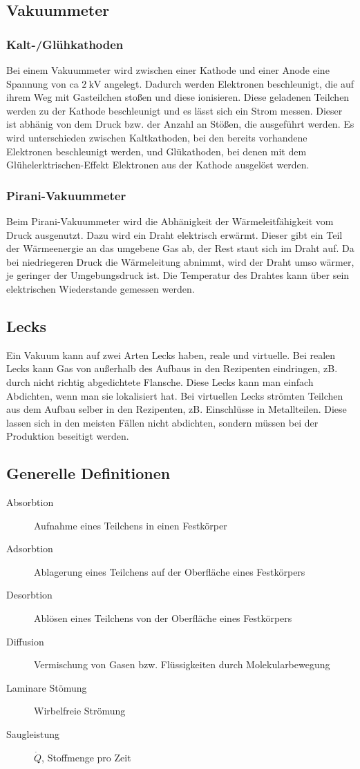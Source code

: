 \subsection{Vakuummeter}
\subsubsection{Kalt-/Glühkathoden}
Bei einem Vakuummeter wird zwischen einer Kathode und einer Anode eine Spannung von ca $\SI{2}{\kilo \volt}$ angelegt. Dadurch werden Elektronen
beschleunigt, die auf ihrem Weg mit Gasteilchen stoßen und diese ionisieren. Diese geladenen Teilchen werden zu der Kathode beschleunigt und es lässt sich ein
Strom messen. Dieser ist abhänig von dem Druck bzw. der Anzahl an Stößen, die ausgeführt werden. Es wird unterschieden zwischen Kaltkathoden, bei den bereits
vorhandene Elektronen beschleunigt werden, und Glükathoden, bei denen mit dem Glühelerktrischen-Effekt Elektronen aus der Kathode ausgelöst werden.
\subsubsection{Pirani-Vakuummeter}
Beim Pirani-Vakuummeter wird die Abhänigkeit der Wärmeleitfähigkeit vom Druck ausgenutzt. Dazu wird ein Draht elektrisch erwärmt. Dieser gibt ein Teil der
Wärmeenergie an das umgebene Gas ab, der Rest staut sich im Draht auf. Da bei niedriegeren Druck die Wärmeleitung abnimmt, wird der Draht umso wärmer, je
geringer der Umgebungsdruck ist. Die Temperatur des Drahtes kann über sein elektrischen Wiederstande gemessen werden.
\subsection{Lecks}
Ein Vakuum kann auf zwei Arten Lecks haben, reale und virtuelle. Bei realen Lecks kann Gas von außerhalb des Aufbaus in den Rezipenten eindringen, zB. durch
nicht richtig abgedichtete Flansche. Diese Lecks kann man einfach Abdichten, wenn man sie lokalisiert hat. Bei virtuellen Lecks strömten Teilchen aus dem
Aufbau selber in den Rezipenten, zB. Einschlüsse in Metallteilen. Diese lassen sich in den meisten Fällen nicht abdichten, sondern müssen bei der Produktion
beseitigt werden.
\subsection{Generelle Definitionen}
\begin{description}
	\item[Absorbtion] Aufnahme eines Teilchens in einen Festkörper
	\item[Adsorbtion] Ablagerung eines Teilchens auf der Oberfläche eines Festkörpers
	\item[Desorbtion] Ablösen eines Teilchens von der Oberfläche eines Festkörpers
	\item[Diffusion] Vermischung von Gasen bzw. Flüssigkeiten durch Molekularbewegung
	\item[Laminare Stömung] Wirbelfreie Strömung
	\item[Saugleistung] $\dot{Q}$, Stoffmenge pro Zeit
\end{description}
